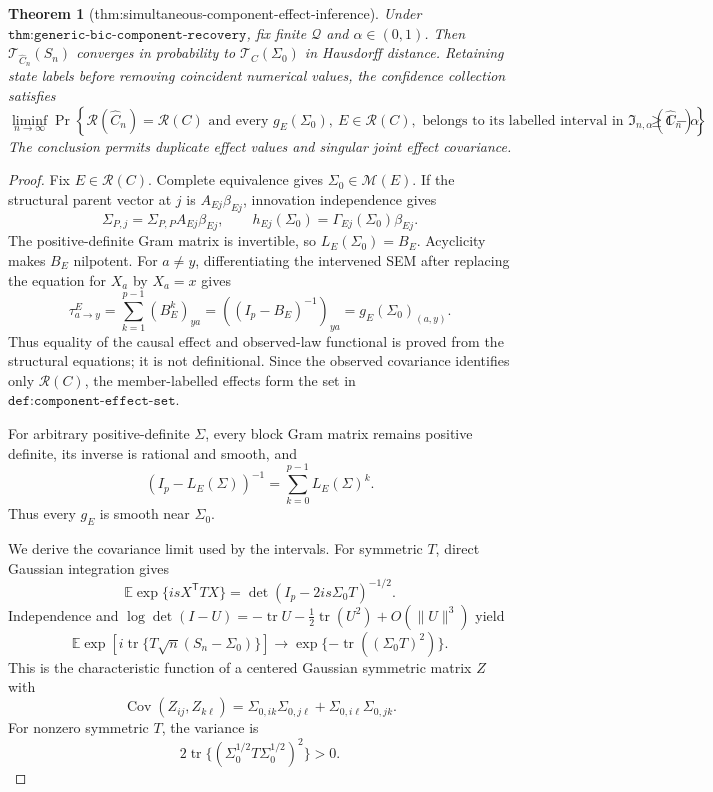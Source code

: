\documentclass{article}
\newtheorem{theorem}{Theorem}
\begin{document}
\begin{theorem}[thm:simultaneous-component-effect-inference]\label{thm:simultaneous-component-effect-inference}
Under \(\texttt{thm:generic-bic-component-recovery}\), fix finite \(\mathcal Q\) and \(\alpha\in(0,1)\). Then \(\mathcal T_{\widehat C_n}(S_n)\) converges in probability to \(\mathcal T_C(\Sigma_0)\) in Hausdorff distance. Retaining state labels before removing coincident numerical values, the confidence collection satisfies \[\liminf_{n\to\infty}\Pr\left\{\mathcal R(\widehat C_n)=\mathcal R(C)\text{ and every }g_E(\Sigma_0),\ E\in\mathcal R(C),\text{ belongs to its labelled interval in }\mathfrak I_{n,\alpha}(\widehat C_n)\right\}\geq1-\alpha.\] The conclusion permits duplicate effect values and singular joint effect covariance.
\end{theorem}
\begin{proof}
Fix \(E\in\mathcal R(C)\).  Complete equivalence gives \(\Sigma_0\in\mathcal M(E)\).  If the structural parent vector at \(j\) is \(A_{Ej}\beta_{Ej}\), innovation independence gives
\[
 \Sigma_{P,j}=\Sigma_{P,P}A_{Ej}\beta_{Ej},\qquad
 h_{Ej}(\Sigma_0)=\Gamma_{Ej}(\Sigma_0)\beta_{Ej}.
\]
The positive-definite Gram matrix is invertible, so \(L_E(\Sigma_0)=B_E\).  Acyclicity makes \(B_E\) nilpotent.  For \(a\ne y\), differentiating the intervened SEM after replacing the equation for \(X_a\) by \(X_a=x\) gives
\[
 \tau^E_{a\to y}=\sum_{k=1}^{p-1}(B_E^k)_{ya}
 =((I_p-B_E)^{-1})_{ya}=g_E(\Sigma_0)_{(a,y)}.
\]
Thus equality of the causal effect and observed-law functional is proved from the structural equations; it is not definitional.  Since the observed covariance identifies only \(\mathcal R(C)\), the member-labelled effects form the set in \(\texttt{def:component-effect-set}\).

For arbitrary positive-definite \(\Sigma\), every block Gram matrix remains positive definite, its inverse is rational and smooth, and
\[
 (I_p-L_E(\Sigma))^{-1}=\sum_{k=0}^{p-1}L_E(\Sigma)^k.
\]
Thus every \(g_E\) is smooth near \(\Sigma_0\).

We derive the covariance limit used by the intervals.  For symmetric \(T\), direct Gaussian integration gives
\[
 \mathbb E\exp\{isX^{\mathsf T}TX\}
 =\det(I_p-2is\Sigma_0T)^{-1/2}.
\]
Independence and \(\log\det(I-U)=-\operatorname{tr}U-\tfrac12\operatorname{tr}(U^2)+O(\|U\|^3)\) yield
\[
 \mathbb E\exp\!\left[i\operatorname{tr}\{T\sqrt n(S_n-\Sigma_0)\}\right]
 \longrightarrow\exp\{-\operatorname{tr}((\Sigma_0T)^2)\}.
\]
This is the characteristic function of a centered Gaussian symmetric matrix \(Z\) with
\[
 \operatorname{Cov}(Z_{ij},Z_{k\ell})
 =\Sigma_{0,ik}\Sigma_{0,j\ell}+\Sigma_{0,i\ell}\Sigma_{0,jk}.
\]
For nonzero symmetric \(T\), the variance is
\[
 2\operatorname{tr}\{(\Sigma_0^{1/2}T\Sigma_0^{1/2})^2\}>0.
\]


\end{proof}
\end{document}
